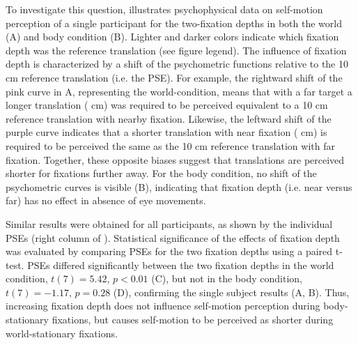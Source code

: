 To investigate this question,  illustrates psychophysical data on self-motion perception of a single participant for the two-fixation depths in both the world (A) and body condition (B). Lighter and darker colors indicate which fixation depth was the reference translation (see figure legend). The influence of fixation depth is characterized by a shift of the psychometric functions relative to the 10 \si{\centi\metre} reference translation (i.e. the PSE). For example, the rightward shift of the pink curve in A, representing the world-condition, means that with a far target a longer translation ( \si{\centi\metre}) was required to be perceived equivalent to a 10 \si{\centi\metre} reference translation with nearby fixation. Likewise, the leftward shift of the purple curve indicates that a shorter translation with near fixation ( \si{\centi\metre}) is required to be perceived the same as the 10 \si{\centi\metre} reference translation with far fixation. Together, these opposite biases suggest that translations are perceived shorter for fixations further away. For the body condition, no shift of the psychometric curves is visible (B), indicating that fixation depth (i.e. near versus far) has no effect in absence of eye movements.

Similar results were obtained for all participants, as shown by the individual PSEs (right column of ). Statistical significance of the effects of fixation depth was evaluated by comparing PSEs for the two fixation depths using a paired t-test. PSEs  differed significantly between the two fixation depths in the world condition, $t(7) = 5.42$, $p < 0.01$ (C), but not in the body condition, $t(7) = -1.17$, $p = 0.28$ (D), confirming the single subject results (A, B). Thus, increasing fixation depth does not influence self-motion perception during body-stationary fixations, but causes self-motion to be perceived as shorter during world-stationary fixations.

